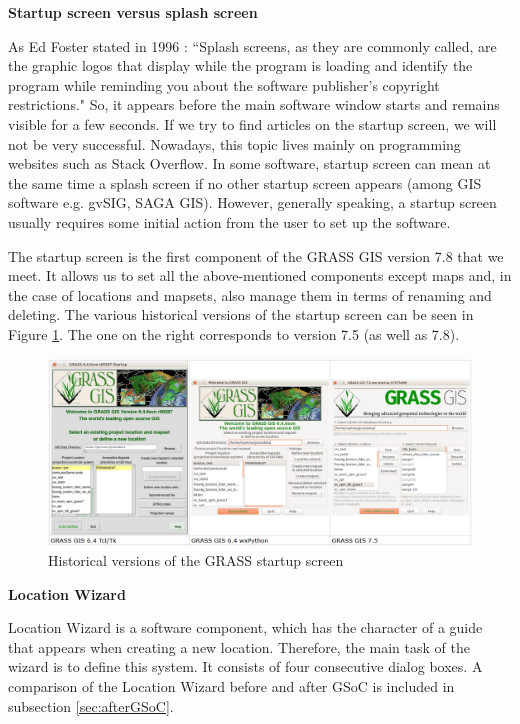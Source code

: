 \documentclass[a4paper,10pt,twoside]{article}
\begin{document}
\bigskip
\noindent \textbf {Startup screen versus splash screen}

\noindent As Ed Foster stated in 1996 \cite{foster}: ``Splash screens, as they are commonly called, are the graphic logos that display while the program is loading and identify the program while reminding you about the software publisher's copyright restrictions." So, it appears before the main software window starts and remains visible for a few seconds. If we try to find articles on the startup screen, we will not be very successful. Nowadays, this topic lives mainly on programming websites such as Stack Overflow. In some software, startup screen can mean at the same time a splash screen if no other startup screen appears (among GIS software e.g. gvSIG, SAGA GIS). However, generally speaking, a startup screen usually requires some initial action from the user to set up the software.

The startup screen is the first component of the GRASS GIS version 7.8 that we meet. It allows us to set all the above-mentioned components except maps and, in the case of locations and mapsets, also manage them in terms of renaming and deleting. The various historical versions of the startup screen can be seen in Figure \ref{fig:verze_startup}. The one on the right corresponds to version 7.5 (as well as 7.8).

\vspace{0.3cm}
\begin{figure}[hbt!]
\begin{center}
\includegraphics[width=17cm]{../pictures/verze_startup.png} 
\caption[Historical versions of the GRASS startup screen]{Historical versions of the GRASS startup screen}
\label{fig:verze_startup}
\end{center}
\end{figure}

\bigskip
\noindent \textbf {Location Wizard}

\noindent Location Wizard is a software component, which has the character of a guide that appears when creating a new location. Therefore, the main task of the wizard is to define this system. It consists of four consecutive dialog boxes. A comparison of the Location Wizard before and after GSoC is included in subsection \ref{sec:afterGSoC}.
\end{document}
